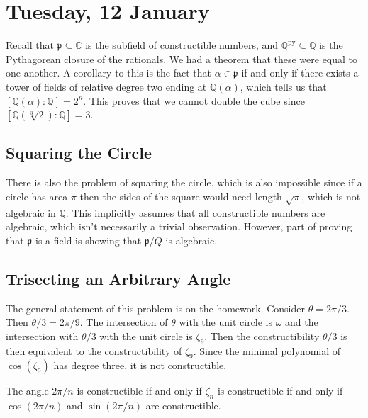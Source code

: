 
\section{Tuesday, 12 January}

Recall that $\mathfrak{p} \subseteq \mathbb{C}$ is the subfield of constructible numbers, and $\mathbb{Q}^{\mathrm{py}} \subseteq \mathbb{Q}$ is the Pythagorean closure of the rationals. We had a theorem that these were equal to one another. A corollary to this is the fact that $\alpha \in \mathfrak{p}$ if and only if there exists a tower of fields of relative degree two ending at $\mathbb{Q}(\alpha)$, which tells us that $[\mathbb{Q}(\alpha) : \mathbb{Q}] = 2^n$. This proves that we cannot double the cube since $[\mathbb{Q}(\sqrt[3]{2}) : \mathbb{Q}] = 3$.

\subsection{Squaring the Circle}
There is also the problem of squaring the circle, which is also impossible since if a circle has area $\pi$ then the sides of the square would need length $\sqrt{\pi}$, which is not algebraic in $\mathbb{Q}$. This implicitly assumes that all constructible numbers are algebraic, which isn't necessarily a trivial observation. However, part of proving that $\mathfrak{p}$ is a field is showing that $\mathfrak{p}/Q$ is algebraic.

\subsection{Trisecting an Arbitrary Angle}
The general statement of this problem is on the homework. Consider $\theta = 2\pi/3$. Then $\theta/3 = 2\pi/9$. The intersection of $\theta$ with the unit circle is $\omega$ and the intersection with $\theta/3$ with the unit circle is $\zeta_9$. Then the constructibility $\theta/3$ is then equivalent to the constructibility of $\zeta_9$. Since the minimal polynomial of $\cos(\zeta_9)$ has degree three, it is not constructible.

\begin{lemma}
The angle $2\pi/n$ is constructible if and only if $\zeta_n$ is constructible if and only if $\cos(2\pi/n)$ and $\sin(2\pi/n)$ are constructible.
\end{lemma}

